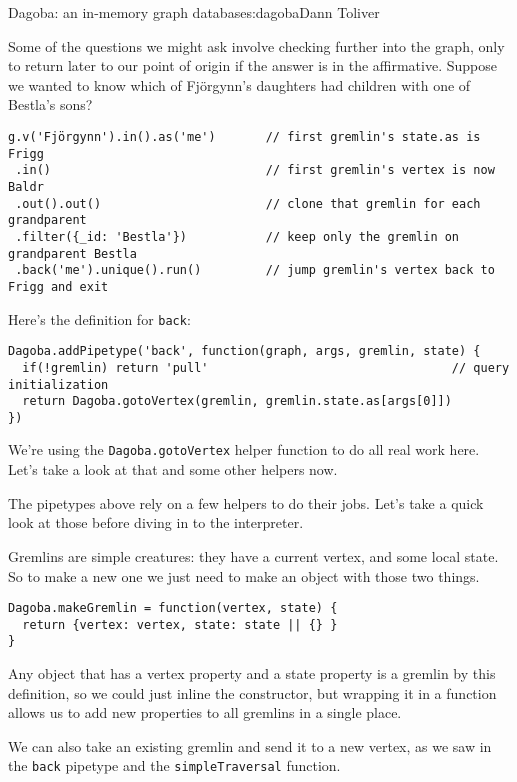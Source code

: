 \begin{aosachapter}{Dagoba: an in-memory graph database}{s:dagoba}{Dann Toliver}
\label{back}

Some of the questions we might ask involve checking further into the
graph, only to return later to our point of origin if the answer is in
the affirmative. Suppose we wanted to know which of Fjörgynn's daughters
had children with one of Bestla's sons?

\begin{verbatim}
g.v('Fjörgynn').in().as('me')       // first gremlin's state.as is Frigg
 .in()                              // first gremlin's vertex is now Baldr
 .out().out()                       // clone that gremlin for each grandparent
 .filter({_id: 'Bestla'})           // keep only the gremlin on grandparent Bestla
 .back('me').unique().run()         // jump gremlin's vertex back to Frigg and exit
\end{verbatim}

Here's the definition for \texttt{back}:

\begin{verbatim}
Dagoba.addPipetype('back', function(graph, args, gremlin, state) {
  if(!gremlin) return 'pull'                                  // query initialization
  return Dagoba.gotoVertex(gremlin, gremlin.state.as[args[0]])
})
\end{verbatim}

We're using the \texttt{Dagoba.gotoVertex} helper function to do all
real work here. Let's take a look at that and some other helpers now.

\label{helpers}

The pipetypes above rely on a few helpers to do their jobs. Let's take a
quick look at those before diving in to the interpreter.

\label{gremlins}

Gremlins are simple creatures: they have a current vertex, and some
local state. So to make a new one we just need to make an object with
those two things.

\begin{verbatim}
Dagoba.makeGremlin = function(vertex, state) {
  return {vertex: vertex, state: state || {} }
}
\end{verbatim}

Any object that has a vertex property and a state property is a gremlin
by this definition, so we could just inline the constructor, but
wrapping it in a function allows us to add new properties to all
gremlins in a single place.

We can also take an existing gremlin and send it to a new vertex, as we
saw in the \texttt{back} pipetype and the \texttt{simpleTraversal}
function.


\end{aosachapter}
